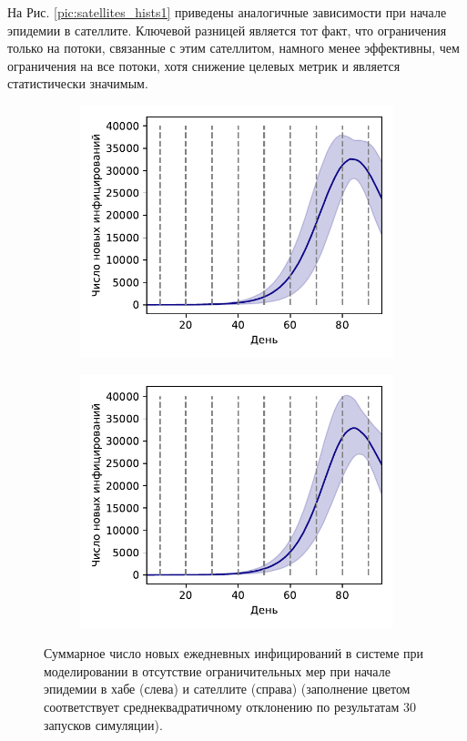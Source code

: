 \documentclass[a4paper,12pt]{article} %
\begin{document}
На Рис. \ref{pic:satellites_hists1} приведены аналогичные зависимости при начале эпидемии в сателлите. Ключевой разницей является тот факт, что ограничения только на потоки, связанные с этим сателлитом, намного менее эффективны, чем ограничения на все потоки, хотя снижение целевых метрик и является статистически значимым.

\begin{figure}[H]
    \centering
    \begin{subfigure}{0.45\linewidth}
        \centering
        \includegraphics[width=\linewidth]{images/satellites_epid0.pdf}
    \end{subfigure}
    \hfill
    \begin{subfigure}{0.45\linewidth}
        \centering
        \includegraphics[width=\linewidth]{images/satellites_epid1.pdf}
    \end{subfigure}
    \caption{Суммарное число новых ежедневных инфицирований в системе при моделировании в отсутствие ограничительных мер при начале эпидемии в хабе (слева) и сателлите (справа) (заполнение цветом соответствует среднеквадратичному отклонению по результатам 30 запусков симуляции).}
    \label{pic:satellites_epid0}
\end{figure}
\end{document}
